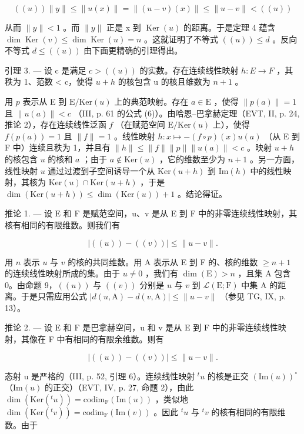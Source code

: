 \[
((u)) \| y \| \leqslant \| u (x) \| = \| (u - v) (x) \| \leqslant \| u - v \| <   ((u))
\]

从而 \(\|y\| < 1\) 。而 \(\|y\|\) 正是 x 到 \(\operatorname{Ker}(u)\) 的距离。于是定理 4 蕴含 \(\dim \operatorname{Ker}(v) \leqslant \dim \operatorname{Ker}(u) = n\) 。这就证明了不等式 \(((u)) \leqslant d\) 。反向不等式 \(d \leqslant ((u))\) 由下面更精确的引理得出。

引理 3. — 设 c 是满足 \(c > ((u))\) 的实数。存在连续线性映射 \(h: E \to F\) ，其秩为 1、范数 \textless{} c，使得 \(u + h\) 的核包含 u 的核且维数为 \(n + 1\) 。

用 \(p\) 表示从 E 到 \(\mathrm{E} / \mathrm{Ker}(u)\) 上的典范映射。存在 \(a \in \mathrm{E}\) ，使得 \(\| p(a) \| = 1\) 且 \(\| u(a) \| < c\) （III, p. 61 的公式 (6)）。由哈恩–巴拿赫定理（EVT, II, p. 24, 推论 2），存在连续线性泛函 \(f\) （在赋范空间 \(\mathrm{E} / \mathrm{Ker}(u)\) 上），使得 \(f(p(a)) = 1\) 且 \(\| f \| = 1\) 。线性映射 \(h: x \mapsto -(f \circ p)(x)u(a)\) （从 E 到 F 中）连续且秩为 1，并且有 \(\| h \| \leqslant \| f \| \| p \| \| u(a) \| < c\) 。映射 \(u + h\) 的核包含 \(u\) 的核和 \(a\) ；由于 \(a \notin \mathrm{Ker}(u)\) ，它的维数至少为 \(n + 1\) 。另一方面，线性映射 \(u\) 通过过渡到子空间诱导一个从 \(\mathrm{Ker}(u + h)\) 到 \(\mathrm{Im}(h)\) 中的线性映射，其核为 \(\mathrm{Ker}(u) \cap \mathrm{Ker}(u + h)\) ，于是 \(\dim(\mathrm{Ker}(u + h)) \leqslant \dim(\mathrm{Ker}(u)) + 1\) 。结论得证。

推论 1. --- 设 E 和 F 是赋范空间，u、v 是从 E 到 F 中的非零连续线性映射，其核有相同的有限维数。则我们有

\[
\left| \left((u)\right) - ((v)) \right| \leqslant \| u - v \|.
\]

用 \(n\) 表示 \(u\) 与 \(v\) 的核的共同维数。用 A 表示从 E 到 F 的、核的维数 \(\geqslant n + 1\) 的连续线性映射所成的集。由于 \(u \neq 0\) ，我们有 \(\dim(\mathrm{E}) > n\) ，且集 A 包含 0。由命题 9，\(((u))\) 与 \(((v))\) 分别是 \(u\) 与 \(v\) 到 \(\mathcal{L}(\mathrm{E};\mathrm{F})\) 中集 A 的距离。于是只需应用公式 \(|d(u,\mathrm{A}) - d(v,\mathrm{A})| \leqslant \|u - v\|\) （参见 TG, IX, p. 13）。

推论 2. --- 设 E 和 F 是巴拿赫空间，u 和 v 是从 E 到 F 中的非零连续线性映射，其像在 F 中有相同的有限余维数。则有

\[
| ((u)) - ((v)) | \leqslant \| u - v \|.
\]

态射 u 是严格的（III, p. 52, 引理 6）。连续线性映射 \({}^{t}u\) 的核是正交 \((\mathrm{Im}(u))^{\circ}\) （\(\mathrm{Im}(u)\) 的正交）（EVT, IV, p. 27, 命题 2），由此 \(\dim(\mathrm{Ker}({}^{t}u)) = \mathrm{codim}_{\mathrm{F}}(\mathrm{Im}(u))\) ，类似地 \(\dim(\mathrm{Ker}({}^{t}v)) = \mathrm{codim}_{\mathrm{F}}(\mathrm{Im}(v))\) 。因此 \({}^{t}u\) 与 \({}^{t}v\) 的核有相同的有限维数。由于

